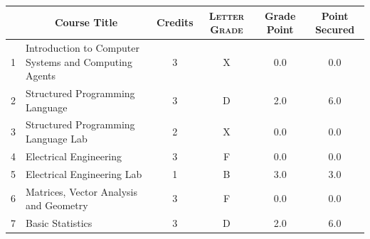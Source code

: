 \documentclass[11pt]{article}
\newcommand*{\numtwo}[1]{\pgfmathprintnumber[
                    fixed, precision=2, fixed zerofill=true]{#1}}
\begin{document}
                \begin{center}
                    \renewcommand{\arraystretch}{1.08}
                    
                \begin{tabular}{|c|l|c|>{\scshape}c|c|c|}
                \hline  \rule[-1ex]{0pt}{3.5ex} {\centering{\bf Course Code}} &  \multicolumn{1}{c|}{\textbf{Course Title}}  & {\bf Credits} & {\bf Letter Grade} & {\bf Grade Point} & {\bf Point Secured}  \\ 
                \hline   1 &  Introduction to Computer Systems and Computing Agents		 & 3 & X & 0.0 & 0.0 \\ %
                \hline   2 &  Structured Programming Language		 & 3 & D & 2.0 & 6.0 \\ %
                \hline   3 &  Structured Programming Language Lab		 & 2 & X & 0.0 & 0.0 \\ %
                \hline   4 &  Electrical Engineering		 & 3 & F & 0.0 & 0.0 \\ %
                \hline   5 &  Electrical Engineering Lab		 & 1 & B & 3.0 & 3.0 \\ %
                \hline   6 &  Matrices, Vector Analysis and Geometry		 & 3 & F & 0.0 & 0.0 \\ %
                \hline   7 &  Basic Statistics		 & 3 & D & 2.0 & 6.0 \\ %

\hline                %
                \end{tabular}
                \end{center}
                \renewcommand{\arraystretch}{1.03}
\end{document}
